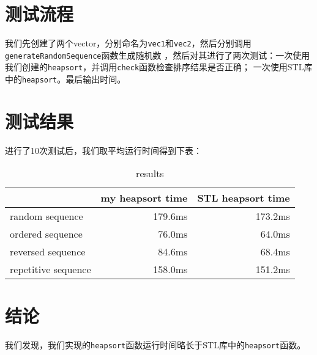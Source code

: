 \documentclass[UTF8]{ctexart}
\begin{document}
\section{测试流程}
我们先创建了两个vector，分别命名为\texttt{vec1}和\texttt{vec2}，然后分别调用\texttt{generateRandomSequence}函数生成随机数
，然后对其进行了两次测试：一次使用我们创建的\texttt{heapsort}，并调用\texttt{check}函数检查排序结果是否正确；
一次使用STL库中的\texttt{heapsort}。最后输出时间。
\section{测试结果}
进行了10次测试后，我们取平均运行时间得到下表：
\begin{table}[h!]
    \centering
    \begin{tabular}{l|r|r}
    \hline
     & my heapsort time & STL heapsort time  \\ \hline
    random sequence & 179.6ms & 173.2ms  \\ \hline
    ordered sequence & 76.0ms & 64.0ms  \\ \hline
    reversed sequence & 84.6ms & 68.4ms  \\ \hline
    repetitive sequence & 158.0ms & 151.2ms  \\ \hline
    \end{tabular}
    \caption{results}
    \end{table}
\section{结论}
    我们发现，我们实现的\texttt{heapsort}函数运行时间略长于STL库中的\texttt{heapsort}函数。
\end{document}
